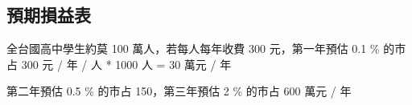 
\subsection{預期損益表}

全台國高中學生約莫 100 萬人，若每人每年收費 300 元，第一年預估 0.1 \% 的市占
300 元 / 年 / 人 * 1000 人 = 30 萬元 / 年

第二年預估 0.5 \% 的市占 150，第三年預估 2 \% 的市占 600 萬元 / 年

